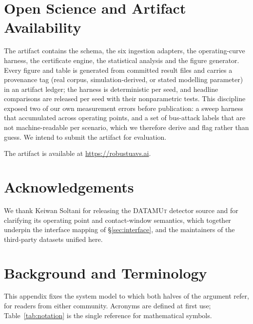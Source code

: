 \documentclass[conference,letterpaper,10pt]{IEEEtran}   %
\newif\ifanon
\newcommand{\dataset}[1]{\textsc{#1}}
\begin{document}
\section{Open Science and Artifact Availability}
\label{sec:openscience}
The artifact contains the schema, the six ingestion adapters, the
operating-curve harness, the certificate engine, the statistical analysis and
the figure generator. Every figure and table is generated from committed result
files and carries a provenance tag (real corpus, simulation-derived, or stated
modelling parameter) in an artifact ledger; the harness is deterministic per
seed, and headline comparisons are released per seed with their nonparametric
tests. This
discipline exposed two of our own measurement errors before publication: a
sweep harness that accumulated across operating points, and a set of bus-attack
labels that are not machine-readable per scenario, which we therefore derive
and flag rather than guess. We intend to submit the artifact for evaluation.
\ifanon
An anonymised copy of the artifact is available for review at
\url{https://anonymous.4open.science/r/From-Wire-to-Flight-UAVs/}; it will be
de-anonymised on acceptance.
\else
The artifact is available at \url{https://robustuavs.ai}.
\fi

\ifanon\else

\section*{Acknowledgements}
We thank Keiwan Soltani for releasing the \dataset{DATAMUt} detector source and
for clarifying its operating point and contact-window semantics, which together
underpin the interface mapping of \S\ref{sec:interface}, and the maintainers of
the third-party datasets unified here.
\fi




\appendices

\section{Background and Terminology}
\label{sec:background}
This appendix fixes the system model to which both halves of the argument
refer, for readers from either community. Acronyms are defined at first use;
Table~\ref{tab:notation} is the single reference for mathematical symbols.
\end{document}
